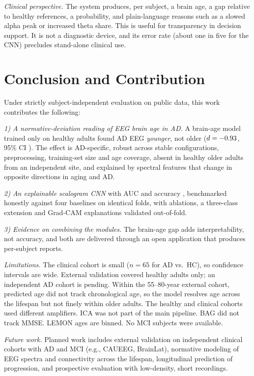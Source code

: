 \documentclass[journal]{IEEEtran}
\begin{document}
\emph{Clinical perspective.} The system produces, per subject, a brain age, a gap relative to healthy references, a probability, and plain-language reasons such as a slowed alpha peak or increased theta share. This is useful for transparency in decision support. It is not a diagnostic device, and its error rate (about one in five for the CNN) precludes stand-alone clinical use.

\section{Conclusion and Contribution}
Under strictly subject-independent evaluation on public data, this work contributes the following:

\emph{1) A normative-deviation reading of EEG brain age in AD.} A brain-age model trained only on healthy adults found AD EEG \emph{younger}, not older ($d=-0.93{}$, 95\% CI \bagDci{}). The effect is AD-specific, robust across \nStable{} stable configurations, preprocessing, training-set size and age coverage, absent in healthy older adults from an independent site, and explained by spectral features that change in opposite directions in aging and AD.

\emph{2) An explainable scalogram CNN} with AUC \cnnAUC{} and accuracy \cnnAcc{}, benchmarked honestly against four baselines on identical folds, with ablations, a three-class extension and Grad-CAM explanations validated out-of-fold.

\emph{3) Evidence on combining the modules.} The brain-age gap adds interpretability, not accuracy, and both are delivered through an open application that produces per-subject reports.

\emph{Limitations.} The clinical cohort is small ($n=65$ for AD vs.\ HC), so confidence intervals are wide. External validation covered healthy adults only; an independent AD cohort is pending. Within the 55--80-year external cohort, predicted age did not track chronological age, so the model resolves age across the lifespan but not finely within older adults. The healthy and clinical cohorts used different amplifiers. ICA was not part of the main pipeline. BAG did not track MMSE. LEMON ages are binned. No MCI subjects were available.

\emph{Future work.} Planned work includes external validation on independent clinical cohorts with AD and MCI (e.g., CAUEEG, BrainLat), normative modeling of EEG spectra and connectivity across the lifespan, longitudinal prediction of progression, and prospective evaluation with low-density, short recordings.
\end{document}
